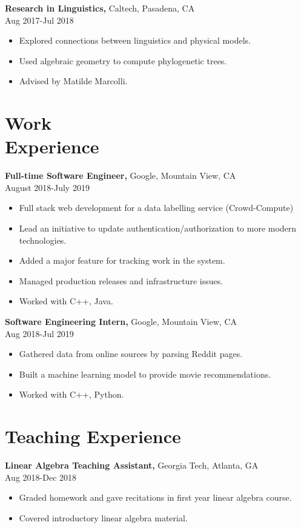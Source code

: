\documentclass[margin]{res}
\begin{document}
\begin{resume}
{\bf Research in Linguistics,} Caltech, Pasadena, CA \\ Aug 2017-Jul 2018
\begin{itemize} \itemsep -2pt %
\item Explored connections between linguistics and physical models.
\item Used algebraic geometry to compute phylogenetic trees.
\item Advised by Matilde Marcolli.
\end{itemize}
 \section{Work\\ Experience}
 {\bf Full-time Software Engineer,} Google, Mountain View, CA \\ August 2018-July 2019
 \begin{itemize} \itemsep -2pt  %
 \item Full stack web development for a data labelling service (Crowd-Compute)
 \item Lead an initiative to update authentication/authorization to more modern technologies.
 \item Added a major feature for tracking work in the system.
 \item Managed production releases and infrastructure issues.
 \item Worked with C++, Java.
 \end{itemize}
 
{\bf Software Engineering Intern,} Google, Mountain View, CA \\ Aug 2018-Jul 2019
\begin{itemize} \itemsep -2pt %
\item Gathered data from online sources by parsing Reddit pages.
\item Built a machine learning model to provide movie recommendations.
\item Worked with C++, Python.
\end{itemize}

\section{Teaching Experience}
{\bf Linear Algebra Teaching Assistant,} Georgia Tech, Atlanta, GA \\ Aug 2018-Dec 2018
\begin{itemize} \itemsep -2pt %
    \item Graded homework and gave recitations in first year linear algebra course.
    \item Covered introductory linear algebra material.
\end{itemize}
 

\end{resume}
\end{document}
